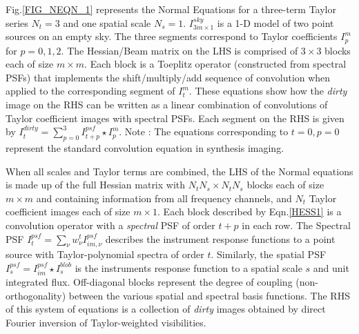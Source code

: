 \documentclass[structabstract]{aa}
\newcommand{\wnt}{{w_{\nu}^t}}
\begin{document}
Fig.\ref{FIG_NEQN_1} represents the Normal Equations for a three-term Taylor series
$N_t = 3$ and one spatial scale $N_s = 1$. 
	$I^{sky}_{3m\times 1}$ is a 1-D model of two point sources on an empty sky. 
	The three segments correspond to Taylor coefficients $I^{m}_p$ for $p=0,1,2$.
	The Hessian/Beam matrix on the LHS is comprised of $3 \times 3$ blocks each
	of size $m\times m$. Each block is a Toeplitz operator (constructed from spectral PSFs)
	that implements the shift/multiply/add sequence of convolution
	when applied to the corresponding segment of $I^{m}_t$.
	These equations show how the {\it dirty} image on the RHS can be
	written as a linear combination of convolutions of Taylor coefficient images with
	spectral PSFs. Each segment on the RHS is given by
	$I^{dirty}_t = \sum_{p=0}^{3} I^{psf}_{t+p} \star I^{m}_p$.
	Note : The equations corresponding to $t=0,p=0$ represent the standard convolution
	equation in synthesis imaging.

When all scales and Taylor terms are combined, 
the LHS of the Normal equations is made up of the full Hessian matrix with
$N_t N_s \times N_t N_s$ blocks each of size $m\times m$ and 
containing information from all frequency channels, 
and $N_t$ Taylor coefficient images each of size $m\times 1$.
Each block described by Eqn.\ref{HESS1} is a convolution operator with a {\it spectral} PSF of order $t+p$ 
in each row. 
The Spectral PSF $ I^{psf}_{t} = \sum_{\nu} \wnt I^{psf}_{im,\nu}$
describes the instrument response functions to a point source with Taylor-polynomial spectra of order $t$.
Similarly, the spatial PSF $ I^{psf}_s = I^{psf}_{im} \star I^{blob}_s $ is the instruments 
response function to a spatial scale $s$ and unit integrated flux.
Off-diagonal blocks represent the degree of coupling (non-orthogonality)
between the various spatial and spectral basis functions.
The RHS of this system of equations is a collection of {\it dirty} images obtained by
direct Fourier inversion of Taylor-weighted visibilities.
\end{document}
